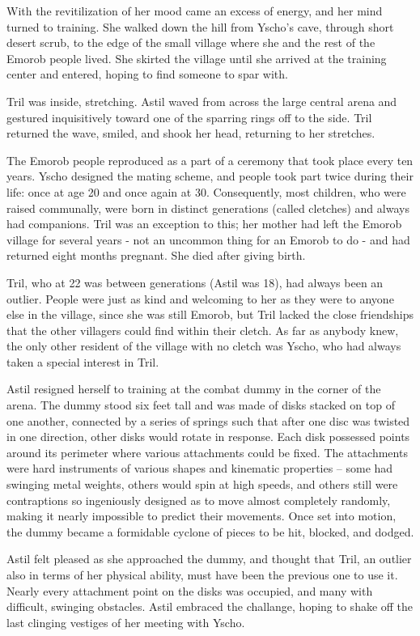 \documentclass[12pt]{book}
\begin{document}
With the revitilization of her mood came an excess of energy, and her mind turned to training.  She walked down the hill from Yscho's cave, through short desert scrub, to the edge of the small village where she and the rest of the Emorob people lived.  She skirted the village until she arrived at the training center and entered, hoping to find someone to spar with. 

Tril was inside, stretching.  Astil waved from across the large central arena and gestured inquisitively toward one of the sparring rings off to the side.  Tril returned the wave, smiled, and shook her head, returning to her stretches.  

The Emorob people reproduced as a part of a ceremony that took place every ten years.  Yscho designed the mating scheme, and people took part twice during their life: once at age 20 and once again at 30.  Consequently, most children, who were raised communally, were born in distinct generations (called cletches) and always had companions.  Tril was an exception to this; her mother had left the Emorob village for several years - not an uncommon thing for an Emorob to do - and had returned eight months pregnant.  She died after giving birth.

Tril, who at 22 was between generations (Astil was 18), had always been an outlier.  People were just as kind and welcoming to her as they were to anyone else in the village, since she was still Emorob, but Tril lacked the close friendships that the other villagers could find within their cletch.  As far as anybody knew, the only other resident of the village with no cletch was Yscho, who had always taken a special interest in Tril.

Astil resigned herself to training at the combat dummy in the corner of the arena.  The dummy stood six feet tall and was made of disks stacked on top of one another, connected by a series of springs such that after one disc was twisted in one direction, other disks would rotate in response.  Each disk possessed points around its perimeter where various attachments could be fixed.  The attachments were hard instruments of various shapes and kinematic properties -- some had swinging metal weights, others would spin at high speeds, and others still were contraptions so ingeniously designed as to move almost completely randomly, making it nearly impossible to predict their movements.  Once set into motion, the dummy became a formidable cyclone of pieces to be hit, blocked, and dodged.

Astil felt pleased as she approached the dummy, and thought that Tril, an outlier also in terms of her physical ability, must have been the previous one to use it.  Nearly every attachment point on the disks was occupied, and many with difficult, swinging obstacles.  Astil embraced the challange, hoping to shake off the last clinging vestiges of her meeting with Yscho.
\end{document}
